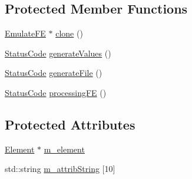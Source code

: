 \subsection*{Protected Member Functions}
\begin{DoxyCompactItemize}
\item 
\hyperlink{classEmulateFE_1_1EmulateFE}{Emulate\+FE} $\ast$ \hyperlink{classEmulateFE_a9a704d0081a275410d19071a006f1a80}{clone} ()
\item 
\hyperlink{classStatusCode}{Status\+Code} \hyperlink{classEmulateFE_ae557d3569b9285a871c502b93ba20494}{generate\+Values} ()
\item 
\hyperlink{classStatusCode}{Status\+Code} \hyperlink{classEmulateFE_ae62bc56b44c4bcdf7f5eab5cbde2cd69}{generate\+File} ()
\item 
\hyperlink{classStatusCode}{Status\+Code} \hyperlink{classEmulateFE_adf7213a308c8a04f4d7efbb86a13689e}{processing\+FE} ()
\end{DoxyCompactItemize}
\subsection*{Protected Attributes}
\begin{DoxyCompactItemize}
\item 
\hyperlink{classElement}{Element} $\ast$ \hyperlink{classProcessus_aa9d24d53c3e52f36786cabb5d8e296e7}{m\+\_\+element}
\item 
std\+::string \hyperlink{classAttrib_a3414521d7a82476e874b25a5407b5e63}{m\+\_\+attrib\+String} \mbox{[}10\mbox{]}
\end{DoxyCompactItemize}
